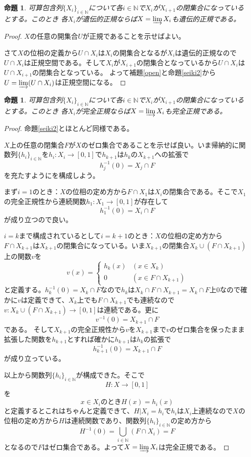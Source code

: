 \documentclass[leqno]{jsarticle}
\newtheorem{prop}[thm]{命題}
\newcommand{\nn}{\mathbb{N}}
\begin{document}
\begin{prop}
可算包含列$\{X_i\}_{i\in \nn}$について各$i\in \nn$で$X_i$が$X_{i+1}$の閉集合になっているとする。このとき
各$X_i$が遺伝的正規ならば$X=\varinjlim X_i$も遺伝的正規である。
\end{prop}
\begin{proof}
$X$の任意の開集合$U$が正規であることを示せばよい。\par
さて$X$の位相の定義から$U\cap X_i$は$X_i$の開集合となるが$X_i$は遺伝的正規なので$U\cap X_i$は正規空間である。そして$X_i$が$X_{i+1}$の閉集合となっているから$U\cap X_i$は$U\cap X_{i+1}$の閉集合となっている。
よって補題\ref{open}と命題\ref{seiki2}から$U=\varinjlim (U\cap X_i)$は正規空間になる。
\end{proof}

\begin{prop}
可算包含列$\{X_i\}_{i\in \nn}$について各$i\in \nn$で$X_i$が$X_{i+1}$の閉集合になっているとする。このとき
各$X_i$が完全正規ならば$X=\varinjlim X_i$も完全正規である。
\end{prop}
\begin{proof}
命題\ref{seiki2}とほとんど同様である。\par
$X$上の任意の閉集合$F$が$X$のゼロ集合であることを示せば良い。いま帰納的に関数列$\{h_i\}_{i\in \nn}$を$h_i:X_i\to [0,1]$で$h_{k+1}$は$h_k$の$X_{k+1}$への拡張で
\[
h_j^{-1}(0)=X_j\cap F
\]
を充たすようにを構成しよう。\par
まず$i=1$のとき：$X$の位相の定め方から$F\cap X_1$は$X_i$の閉集合である。そこで$X_1$の完全正規性から連続関数$h_1:X_1\to [0,1]$が存在して
\[
h_1^{-1}(0)=X_i\cap F
\]
が成り立つので良い。\par
$i=k$まで構成されているとして$i=k+1$のとき：$X$の位相の定め方から$F\cap X_{k+1}$は$X_{k+1}$の閉集合になっている。いま$X_{k+1}$の閉集合$X_k\cup (F\cap X_{k+1})$上の関数$v$を
\[
v(x)=
\begin{cases}
h_k(x) & \text{$(x\in X_k)$}\\
0 & \text{$(x\in F\cap X_{k+1})$}
\end{cases}
\]
と定義する。$h_k^{-1}(0)=X_k\cap F$なので$h_k$は$X_k\cap F\cap X_{k+1}=X_k\cap F$上$0$なので確かに$v$は定義できて、$X_k$上でも$F\cap X_{k+1}$でも連続なので$v:X_k\cup (F\cap X_{k+1})\to [0,1]$は連続である。更に
\[
v^{-1}(0)=X_{k+1}\cap F
\]
である。
そして$X_{k+1}$の完全正規性から$v$を$X_{k+1}$まで$v$のゼロ集合を保ったまま拡張した関数を$h_{k+1}$とすれば確かに$h_{k+1}$は$h_k$の拡張で
\[
h_{k+1}^{-1}(0)=X_{k+1}\cap F
\]
が成り立っている。\par
以上から関数列$\{h_i\}_{i\in \nn}$が構成できた。そこで
\[
H:X\to [0,1]
\]
を
\[
\mbox{$x\in X_i$のとき$H(x)=h_i(x)$}
\]
と定義するとこれはちゃんと定義できて、$H|X_i=h_i$で$h_i$は$X_i$上連続なので$X$の位相の定め方から$H$は連続関数であり、関数列$\{h_i\}_{i\in \nn}$の定め方から
\[
H^{-1}(0)=\bigcup_{i\in\nn}(F\cap X_i)=F
\]
となるので$F$はゼロ集合である。よって$X=\varinjlim X_i$は完全正規である。

\end{proof}
\end{document}

